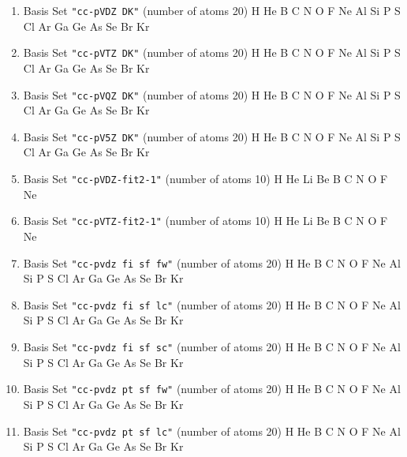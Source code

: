 \begin{enumerate}
\item Basis Set \verb#"cc-pVDZ DK"# (number of atoms 20)  \newline 
  H He B C N O F Ne Al Si P S Cl Ar Ga Ge As Se Br Kr


\item Basis Set \verb#"cc-pVTZ DK"# (number of atoms 20)  \newline 
  H He B C N O F Ne Al Si P S Cl Ar Ga Ge As Se Br Kr


\item Basis Set \verb#"cc-pVQZ DK"# (number of atoms 20)  \newline 
  H He B C N O F Ne Al Si P S Cl Ar Ga Ge As Se Br Kr


\item Basis Set \verb#"cc-pV5Z DK"# (number of atoms 20)  \newline 
  H He B C N O F Ne Al Si P S Cl Ar Ga Ge As Se Br Kr


\item Basis Set \verb#"cc-pVDZ-fit2-1"# (number of atoms 10)  \newline 
  H He Li Be B C N O F Ne


\item Basis Set \verb#"cc-pVTZ-fit2-1"# (number of atoms 10)  \newline 
  H He Li Be B C N O F Ne


\item Basis Set \verb#"cc-pvdz fi sf fw"# (number of atoms 20)  \newline 
  H He B C N O F Ne Al Si P S Cl Ar Ga Ge As Se Br Kr


\item Basis Set \verb#"cc-pvdz fi sf lc"# (number of atoms 20)  \newline 
  H He B C N O F Ne Al Si P S Cl Ar Ga Ge As Se Br Kr


\item Basis Set \verb#"cc-pvdz fi sf sc"# (number of atoms 20)  \newline 
  H He B C N O F Ne Al Si P S Cl Ar Ga Ge As Se Br Kr


\item Basis Set \verb#"cc-pvdz pt sf fw"# (number of atoms 20)  \newline 
  H He B C N O F Ne Al Si P S Cl Ar Ga Ge As Se Br Kr


\item Basis Set \verb#"cc-pvdz pt sf lc"# (number of atoms 20)  \newline 
  H He B C N O F Ne Al Si P S Cl Ar Ga Ge As Se Br Kr



\end{enumerate}
